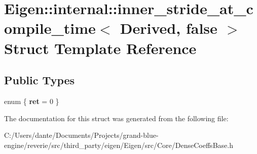 \hypertarget{struct_eigen_1_1internal_1_1inner__stride__at__compile__time_3_01_derived_00_01false_01_4}{}\section{Eigen\+::internal\+::inner\+\_\+stride\+\_\+at\+\_\+compile\+\_\+time$<$ Derived, false $>$ Struct Template Reference}
\label{struct_eigen_1_1internal_1_1inner__stride__at__compile__time_3_01_derived_00_01false_01_4}
\subsection*{Public Types}
\begin{DoxyCompactItemize}
\item 
\mbox{\label{struct_eigen_1_1internal_1_1inner__stride__at__compile__time_3_01_derived_00_01false_01_4_a39a0d40f378d0a65e5111cb2ba8f5bba}} 
enum \{ {\bfseries ret} = 0
 \}
\end{DoxyCompactItemize}


The documentation for this struct was generated from the following file\+:\begin{DoxyCompactItemize}
\item 
C\+:/\+Users/dante/\+Documents/\+Projects/grand-\/blue-\/engine/reverie/src/third\+\_\+party/eigen/\+Eigen/src/\+Core/Dense\+Coeffs\+Base.\+h\end{DoxyCompactItemize}
